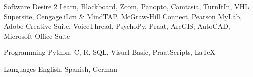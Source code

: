 


\begin{cvskills}


\cvskill
{Software} %
{Desire 2 Learn, Blackboard, Zoom, Panopto, Camtasia, TurnItIn, VHL Supersite, Cengage iLrn \& MindTAP, \newline 
McGraw-Hill Connect, Pearson MyLab, Adobe Creative Suite, VoiceThread, PsychoPy, Praat, ArcGIS, AutoCAD, \newline Microsoft Office Suite} %


\cvskill
{Programming} %
{Python, C, R, SQL, Visual Basic, PraatScripts, LaTeX} %



\cvskill
{Languages} %
{English, Spanish, German} %

\vspace{-7mm}
\end{cvskills}